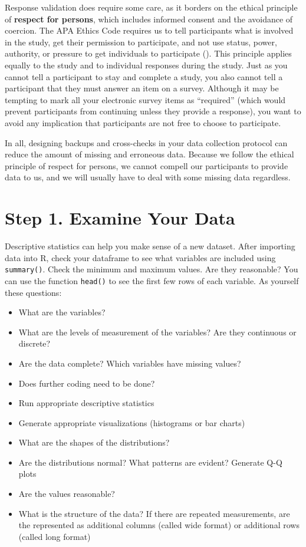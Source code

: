 \documentclass[
]{book}
\begin{document}
Response validation does require some care, as it borders on the ethical principle of \textbf{respect for persons}, which includes informed consent and the avoidance of coercion. The APA Ethics Code requires us to tell participants what is involved in the study, get their permission to participate, and not use status, power, authority, or pressure to get individuals to participate (\citet{APA}). This principle applies equally to the study and to individual responses during the study. Just as you cannot tell a participant to stay and complete a study, you also cannot tell a participant that they must answer an item on a survey. Although it may be tempting to mark all your electronic survey items as ``required'' (which would prevent participants from continuing unless they provide a response), you want to avoid any implication that participants are not free to choose to participate.

In all, designing backups and cross-checks in your data collection protocol can reduce the amount of missing and erroneous data. Because we follow the ethical principle of respect for persons, we cannot compell our participants to provide data to us, and we will usually have to deal with some missing data regardless.

\hypertarget{step-1.-examine-your-data}{%
\section{Step 1. Examine Your Data}\label{step-1.-examine-your-data}}

Descriptive statistics can help you make sense of a new dataset. After importing data into R, check your dataframe to see what variables are included using \texttt{summary()}. Check the minimum and maximum values. Are they reasonable? You can use the function \texttt{head()} to see the first few rows of each variable. As yourself these questions:

\begin{itemize}
\item
  What are the variables?
\item
  What are the levels of measurement of the variables? Are they continuous or discrete?
\item
  Are the data complete? Which variables have missing values?
\item
  Does further coding need to be done?
\item
  Run appropriate descriptive statistics
\item
  Generate appropriate visualizations (histograms or bar charts)
\item
  What are the shapes of the distributions?
\item
  Are the distributions normal? What patterns are evident? Generate Q-Q plots
\item
  Are the values reasonable?
\item
  What is the structure of the data? If there are repeated measurements, are the represented as additional columns (called wide format) or additional rows (called long format)
\end{itemize}
\end{document}
